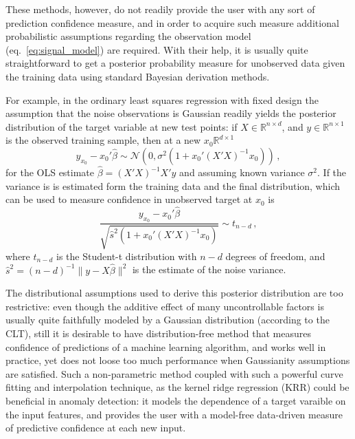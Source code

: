 \documentclass[a4paper,14pt]{extarticle}
\newcommand{\Ncal}{\mathcal{N}}
\newcommand{\Real}{\mathbb{R}}
\begin{document}
These methods, however, do not readily provide the user with any sort of prediction
confidence measure, and in order to acquire such measure additional probabilistic
assumptions regarding the observation model (eq.~\ref{eq:signal_model}) are required.
With their help, it is usually quite straightforward to get a posterior probability
measure for unobserved data given the training data using standard Bayesian derivation
methods.

For example, in the ordinary least squares regression with fixed design the assumption
that the noise observations is Gaussian readily yields the posterior distribution of
the target variable at new test points: if $X\in \Real^{n\times d}$, and $y\in\Real^{n\times1}$
is the observed training sample, then at a new $x_0\Real^{d\times 1}$
\begin{equation}
  y_{x_0} - x_0'\hat{\beta} \sim \Ncal(0, \sigma^2(1 + x_0'(X'X)^{-1} x_0)) \,,
\end{equation}
for the OLS estimate $\hat{\beta} = (X'X)^{-1} X'y$ and assuming known variance $\sigma^2$.
If the variance is is estimated form the training data and the final distribution,
which can be used to measure confidence in unobserved target at $x_0$ is
\begin{equation*}
  \frac{y_{x_0} - x_0'\hat{\beta}}{\sqrt{\hat{s}^2 (1 + x_0'(X'X)^{-1} x_0)}}
    \sim t_{n-d} \,,
\end{equation*}
where $t_{n-d}$ is the Student-t distribution with $n-d$ degrees of freedom, and
$\hat{s}^2 = (n-d)^{-1}\|y-X\hat{\beta}\|^2$ is the estimate of the noise variance.

The distributional assumptions used to derive this posterior distribution are too
restrictive: even though the additive effect of many uncontrollable factors is usually
quite faithfully modeled by a Gaussian distribution (according to the CLT), still
it is desirable to have distribution-free method that measures confidence of predictions
of a machine learning algorithm, and works well in practice, yet does not loose too
much performance when Gaussianity assumptions are satisfied. Such a non-parametric
method coupled with such a powerful curve fitting and interpolation technique, as
the kernel ridge regression (KRR) could be beneficial in anomaly detection: it models
the dependence of a target varaible on the input features, and provides the user with
a model-free data-driven measure of predictive confidence at each new input.
\end{document}
